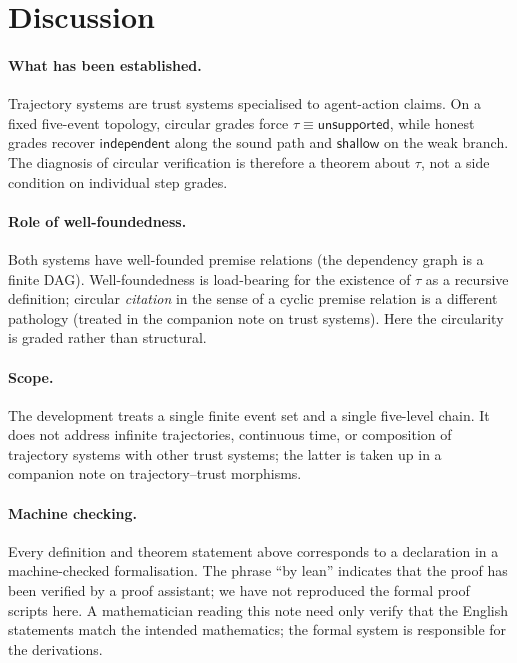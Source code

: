 \documentclass[11pt,a4paper]{article}
\theoremstyle{plain}
\theoremstyle{definition}
\newcommand{\tauu}{\tau}
\begin{document}
\section{Discussion}

\paragraph{What has been established.}
Trajectory systems are trust systems specialised to agent-action claims.
On a fixed five-event topology, circular grades force
$\tauu \equiv \mathsf{unsupported}$, while honest grades recover
$\mathsf{independent}$ along the sound path and $\mathsf{shallow}$ on the
weak branch. The diagnosis of circular verification is therefore a theorem
about $\tauu$, not a side condition on individual step grades.

\paragraph{Role of well-foundedness.}
Both systems have well-founded premise relations (the dependency graph is a
finite DAG). Well-foundedness is load-bearing for the existence of $\tauu$ as
a recursive definition; circular \emph{citation} in the sense of a cyclic
premise relation is a different pathology (treated in the companion note on
trust systems). Here the circularity is graded rather than structural.

\paragraph{Scope.}
The development treats a single finite event set and a single five-level
chain. It does not address infinite trajectories, continuous time, or
composition of trajectory systems with other trust systems; the latter is
taken up in a companion note on trajectory--trust morphisms.

\paragraph{Machine checking.}
Every definition and theorem statement above corresponds to a declaration in
a machine-checked formalisation. The phrase ``by lean'' indicates that the
proof has been verified by a proof assistant; we have not reproduced the
formal proof scripts here. A mathematician reading this note need only
verify that the English statements match the intended mathematics; the
formal system is responsible for the derivations.
\end{document}
